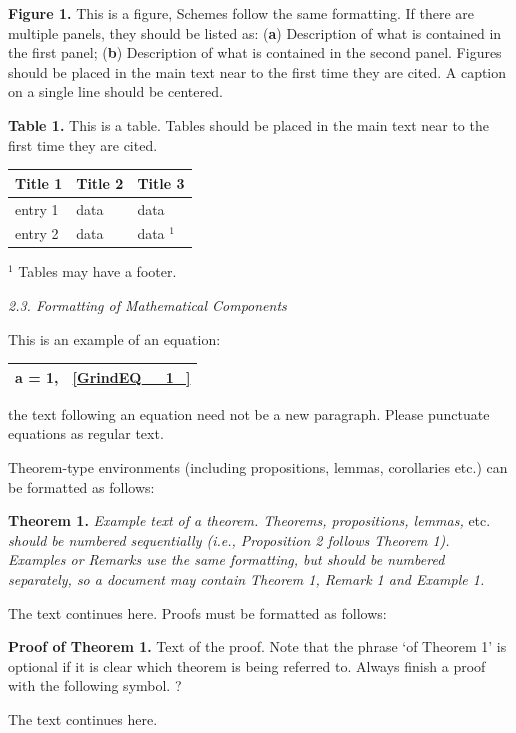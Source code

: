 \documentclass{article} %
\begin{document}
\textbf{Figure 1.} This is a figure, Schemes follow the same formatting. If there are multiple panels, they should be listed as: (\textbf{a}) Description of what is contained in the first panel; (\textbf{b}) Description of what is contained in the second panel. Figures should be placed in the main text near to the first time they are cited. A caption on a single line should be centered.

\noindent \textbf{Table 1.} This is a table. Tables should be placed in the main text near to the first time they are cited.

\begin{tabular}{|p{0.7in}|p{0.7in}|p{0.7in}|} \hline 
\textbf{Title 1} & \textbf{Title 2} & \textbf{Title 3} \\ \hline 
entry 1 & data & data \\ \hline 
entry 2 & data & data ${}^{1}$ \\ \hline 
\end{tabular}

${}^{1}$ Tables may have a footer.

\noindent \textit{2.3. Formatting of Mathematical Components}

This is an example of an equation:

\begin{tabular}{|p{3.9in}|p{0.2in}|} \hline 
a = 1, & \eqref{GrindEQ__1_} \\ \hline 
\end{tabular}

the text following an equation need not be a new paragraph. Please punctuate equations as regular text.

Theorem-type environments (including propositions, lemmas, corollaries etc.) can be formatted as follows:

\noindent \textbf{Theorem 1.}\textit{ Example text of a theorem. Theorems, propositions, lemmas, }etc.\textit{ should be numbered sequentially (i.e., Proposition 2 follows Theorem 1). Examples or Remarks use the same formatting, but should be numbered separately, so a document may contain Theorem 1, Remark 1 and Example 1.}

The text continues here. Proofs must be formatted as follows:

\noindent \textbf{Proof of Theorem 1.} Text of the proof. Note that the phrase `of Theorem 1' is optional if it is clear which theorem is being referred to. Always finish a proof with the following symbol. ?

The text continues here.
\end{document}
